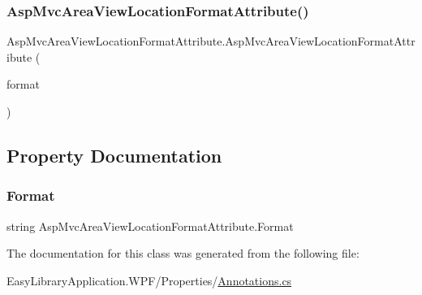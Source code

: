 \subsubsection{\texorpdfstring{Asp\+Mvc\+Area\+View\+Location\+Format\+Attribute()}{AspMvcAreaViewLocationFormatAttribute()}}
{\footnotesize\ttfamily Asp\+Mvc\+Area\+View\+Location\+Format\+Attribute.\+Asp\+Mvc\+Area\+View\+Location\+Format\+Attribute (\begin{DoxyParamCaption}\item[{\mbox{[}\+Not\+Null\mbox{]} string}]{format }\end{DoxyParamCaption})}



\subsection{Property Documentation}
\mbox{\label{class_asp_mvc_area_view_location_format_attribute_ac3d03e8d1371c427048f84046c327e0e}} 
\subsubsection{\texorpdfstring{Format}{Format}}
{\footnotesize\ttfamily string Asp\+Mvc\+Area\+View\+Location\+Format\+Attribute.\+Format\hspace{0.3cm}{\ttfamily [get]}}



The documentation for this class was generated from the following file\+:\begin{DoxyCompactItemize}
\item 
Easy\+Library\+Application.\+W\+P\+F/\+Properties/\mbox{\hyperlink{_annotations_8cs}{Annotations.\+cs}}\end{DoxyCompactItemize}

